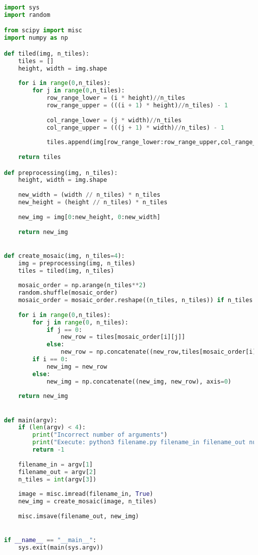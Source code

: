 \documentclass[journal]{IEEEtran}
\begin{document}
\begin{lstlisting}[language=Python, caption=Mosaic code, label=list:mosaic_code]
import sys
import random

from scipy import misc
import numpy as np

def tiled(img, n_tiles):
	tiles = []
	height, width = img.shape
	
	for i in range(0,n_tiles):
		for j in range(0,n_tiles):
			row_range_lower = (i * height)//n_tiles
			row_range_upper = (((i + 1) * height)//n_tiles) - 1
			
			col_range_lower = (j * width)//n_tiles
			col_range_upper = (((j + 1) * width)//n_tiles) - 1
			
			tiles.append(img[row_range_lower:row_range_upper,col_range_lower:col_range_upper])
	
	return tiles

def preprocessing(img, n_tiles):
	height, width = img.shape
	
	new_width = (width // n_tiles) * n_tiles
	new_height = (height // n_tiles) * n_tiles
	
	new_img = img[0:new_height, 0:new_width]
	
	return new_img


def create_mosaic(img, n_tiles=4):
	img = preprocessing(img, n_tiles)
	tiles = tiled(img, n_tiles)
	
	mosaic_order = np.arange(n_tiles**2)
	random.shuffle(mosaic_order)
	mosaic_order = mosaic_order.reshape((n_tiles, n_tiles)) if n_tiles != 4 else np.array([5, 10, 12, 2, 7, 15, 0, 8, 11, 13, 1, 6, 3, 14, 9, 4]).reshape((n_tiles, n_tiles))
	
	for i in range(0,n_tiles):
		for j in range(0, n_tiles):
			if j == 0:
				new_row = tiles[mosaic_order[i][j]]
			else:
				new_row = np.concatenate((new_row,tiles[mosaic_order[i][j]]), axis=1)
		if i == 0:
			new_img = new_row
		else:
			new_img = np.concatenate((new_img, new_row), axis=0)
	
	return new_img


def main(argv):
	if (len(argv) < 4):
		print("Incorrect number of arguments")
		print("Execute: python3 filename.py filename_in filename_out number_of_tiles")
		return -1
	
	filename_in = argv[1]
	filename_out = argv[2]
	n_tiles = int(argv[3])
	
	image = misc.imread(filename_in, True)
	new_img = create_mosaic(image, n_tiles)
	
	misc.imsave(filename_out, new_img)


if __name__ == "__main__":
	sys.exit(main(sys.argv))
\end{lstlisting}
\end{document}
